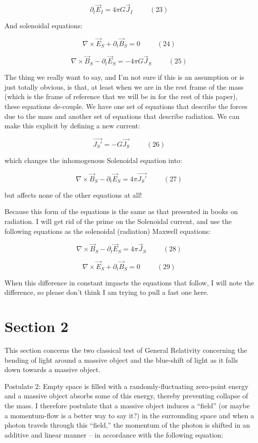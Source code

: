 \documentclass {article}
\begin{document}
$$ \partial_t \vec E_I = 4 \pi G \vec J_I ~~~~~~~~~~~ (23)$$

And solenoidal equations:

$$\nabla \times \vec E_S + \partial_t \vec B_S = 0 ~~~~~~~~~~~ (24)$$

$$\nabla \times \vec B_S - \partial_t \vec E_S =  - 4 \pi G \vec J_S ~~~~~~~~~~~ (25)$$

The thing we really want to say, and I'm not sure if this is an assumption or is just totally obvious, is that, at least when we are in the rest frame of the mass (which is the frame of reference that we will be in for the rest of this paper), these equations de-couple. We have one set of equations that describe the forces due to the mass and another set of equations that describe radiation. We can make this explicit by defining a new current:

$$\vec {J_S'} = - G \vec {J_S} ~~~~~~~~~~~ (26)$$

which changes the inhomogenous Solenoidal equation into:

$$\nabla \times \vec B_S - \partial_t \vec E_S =  4 \pi \vec {J_S'} ~~~~~~~~~~~ (27)$$

but affects none of the other equations at all!

Because this form of the equations is the same as that presented in books on radiation. I will get rid of the prime on the Solenoidal current, and use the following equations as the solenoidal (radiation) Maxwell equations:

$$\nabla \times \vec B_S - \partial_t \vec E_S =  4 \pi \vec J_S ~~~~~~~~~~~ (28)$$

$$\nabla \times \vec E_S + \partial_t \vec B_S = 0 ~~~~~~~~~~~ (29)$$

When this difference in constant impacts the equations that follow, I will note the difference, so please don't think I am trying to pull a fast one here.

\section{Section 2}

This section concerns the two classical test of General Relativity concerning the bending of light around a massive object and the blue-shift of light as it falls down towards a massive object.

Postulate 2: Empty space is filled with a randomly-fluctuating zero-point energy and a massive object absorbs some of this energy, thereby preventing collapse of the mass. I therefore postulate that a massive object induces a “field” (or maybe a momentum-flow is a better way to say it?) in the surrounding space and when a photon travels through this “field,” the momentum of the photon is shifted in an additive and linear manner – in accordance with the following equation: 
\end{document}
